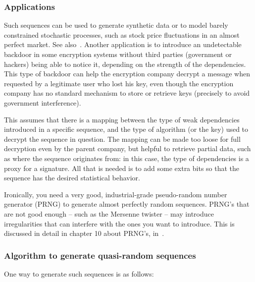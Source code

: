 \documentclass[oneside,10pt]{book}
\begin{document}
\subsubsection{Applications}

Such sequences can be used to generate \textcolor{index}{synthetic data}  or to model barely constrained stochastic processes, such as stock price fluctuations in an almost perfect market. See also~\cite{pac203}. Another application is
 to introduce an undetectable backdoor in some encryption systems without third parties (government or hackers) being able to notice it, depending on the strength of the dependencies. This type of backdoor can help the encryption company decrypt a message when requested by a
 legitimate user who lost his key, even though the encryption company has no standard mechanism to store or retrieve keys (precisely to avoid government interference).

This assumes that there is a mapping between the  type of weak dependencies introduced in a specific sequence, and the
 type of algorithm (or the key) used to decrypt the sequence in question. The mapping can be made too loose for full decryption even by the parent company, but helpful to retrieve partial data, such as where the sequence originates from: in this case, the type of dependencies is a proxy for a signature. All that is needed is to add some extra bits so that the sequence has the desired statistical behavior.

Ironically, you need a very good, industrial-grade \textcolor{index}{pseudo-random number generator} (PRNG) to generate almost perfectly random sequences. PRNG's that are not good enough -- such as the \textcolor{index}{Mersenne twister} -- may introduce irregularities that can interfere with the ones you want to introduce. This is discussed
 in detail in chapter 10 about PRNG's, in~\cite{vgsynthetic}.

\subsubsection{Algorithm to generate quasi-random sequences}\label{qrrnd}

One way to generate such sequences is as follows: \vspace{1ex}
\end{document}
